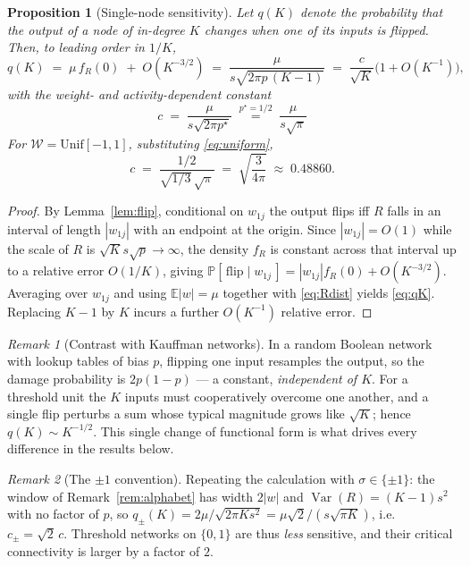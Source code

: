 \documentclass[11pt]{article}
\newtheorem{proposition}{Proposition}
\theoremstyle{remark}
\newtheorem{remark}{Remark}
\newcommand{\E}{\mathbb{E}}
\newcommand{\Prob}{\mathbb{P}}
\begin{document}
\begin{proposition}[Single-node sensitivity]
\label{prop:q}
Let $q(K)$ denote the probability that the output of a node of in-degree $K$
changes when one of its inputs is flipped. Then, to leading order in $1/K$,
\begin{equation}
  q(K) \;=\; \mu\, f_R(0) \;+\; O(K^{-3/2})
  \;=\; \frac{\mu}{s\sqrt{2\pi p\,(K-1)}}
  \;=\; \frac{c}{\sqrt{K}}\Big(1+O(K^{-1})\Big),
  \label{eq:qK}
\end{equation}
with the weight- and activity-dependent constant
\begin{equation}
  \boxed{\;c \;=\; \frac{\mu}{s\sqrt{2\pi p^\star}}
  \;\overset{p^\star=1/2}{=}\; \frac{\mu}{s\sqrt{\pi}} \;}
  \label{eq:c}
\end{equation}
For $\mathcal{W}=\mathrm{Unif}[-1,1]$, substituting \eqref{eq:uniform},
\begin{equation}
  c \;=\; \frac{1/2}{\sqrt{1/3}\,\sqrt{\pi}}
    \;=\; \sqrt{\frac{3}{4\pi}} \;\approx\; 0.48860 .
  \label{eq:cuniform}
\end{equation}
\end{proposition}

\begin{proof}
By Lemma~\ref{lem:flip}, conditional on $w_{1j}$ the output flips iff $R$ falls
in an interval of length $|w_{1j}|$ with an endpoint at the origin. Since
$|w_{1j}|=O(1)$ while the scale of $R$ is $\sqrt{K}s\sqrt{p}\to\infty$, the
density $f_R$ is constant across that interval up to a relative error
$O(1/K)$, giving $\Prob[\,\text{flip}\mid w_{1j}\,]=|w_{1j}|f_R(0)+O(K^{-3/2})$.
Averaging over $w_{1j}$ and using $\E|w|=\mu$ together with \eqref{eq:Rdist}
yields \eqref{eq:qK}. Replacing $K-1$ by $K$ incurs a further $O(K^{-1})$
relative error.
\end{proof}

\begin{remark}[Contrast with Kauffman networks]
In a random Boolean network with lookup tables of bias $p$, flipping one input
resamples the output, so the damage probability is $2p(1-p)$ --- a constant,
\emph{independent of $K$}. For a threshold unit the $K$ inputs must
cooperatively overcome one another, and a single flip perturbs a sum whose
typical magnitude grows like $\sqrt K$; hence $q(K)\sim K^{-1/2}$. This single
change of functional form is what drives every difference in the results below.
\end{remark}

\begin{remark}[The $\pm1$ convention]
\label{rem:pm1}
Repeating the calculation with $\sigma\in\{\pm1\}$: the window of
Remark~\ref{rem:alphabet} has width $2|w|$ and $\operatorname{Var}(R)=(K-1)s^2$
with no factor of $p$, so $q_{\pm}(K)=2\mu/\sqrt{2\pi K s^2}
=\mu\sqrt{2}/(s\sqrt{\pi K})$, i.e.\ $c_{\pm}=\sqrt2\,c$. Threshold networks on
$\{0,1\}$ are thus \emph{less} sensitive, and their critical connectivity is
larger by a factor of $2$.
\end{remark}
\end{document}
